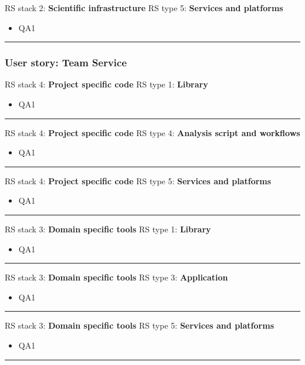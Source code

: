 RS stack 2: \textbf{Scientific infrastructure} \tab RS type 5: \textbf{Services and platforms}

\begin{itemize}
    \item QA1
\end{itemize}
\hrule

\subsubsection{User story: Team Service}

RS stack 4: \textbf{Project specific code} \tab RS type 1: \textbf{Library}

\begin{itemize}
    \item QA1
\end{itemize}
\hrule

RS stack 4: \textbf{Project specific code} \tab RS type 4: \textbf{Analysis script and workflows}

\begin{itemize}
    \item QA1
\end{itemize}
\hrule

RS stack 4: \textbf{Project specific code} \tab RS type 5: \textbf{Services and platforms}

\begin{itemize}
    \item QA1
\end{itemize}
\hrule

RS stack 3: \textbf{Domain specific tools} \tab RS type 1: \textbf{Library}

\begin{itemize}
    \item QA1
\end{itemize}
\hrule

RS stack 3: \textbf{Domain specific tools} \tab RS type 3: \textbf{Application}

\begin{itemize}
    \item QA1
\end{itemize}
\hrule

RS stack 3: \textbf{Domain specific tools} \tab RS type 5: \textbf{Services and platforms}

\begin{itemize}
    \item QA1
\end{itemize}
\hrule

